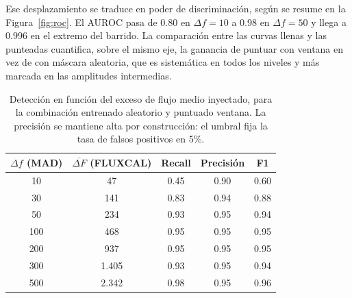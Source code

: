 Ese desplazamiento se traduce en poder de discriminación, según se resume en la Figura~\ref{fig:roc}. El AUROC pasa de 0.80 en $\Delta f = 10$ a 0.98 en $\Delta f = 50$ y llega a 0.996 en el extremo del barrido. La comparación entre las curvas llenas y las punteadas cuantifica, sobre el mismo eje, la ganancia de puntuar con ventana en vez de con máscara aleatoria, que es sistemática en todos los niveles y más marcada en las amplitudes intermedias.

\begin{figure}[H]
\centering
{}
\end{figure}

\begin{table}[H]
\centering
\begin{tabular}{|c|c|c|c|c|}
\hline
$\Delta f$ \textbf{(MAD)} & $\overline{\Delta F}$ \textbf{(FLUXCAL)} & \textbf{Recall} & \textbf{Precisión} & \textbf{F1} \\
\hline
10  & 47    & 0.45 & 0.90 & 0.60 \\
30  & 141   & 0.83 & 0.94 & 0.88 \\
50  & 234   & 0.93 & 0.95 & 0.94 \\
100 & 468   & 0.95 & 0.95 & 0.95 \\
200 & 937   & 0.95 & 0.95 & 0.95 \\
300 & 1.405 & 0.93 & 0.95 & 0.94 \\
500 & 2.342 & 0.98 & 0.95 & 0.96 \\
\hline
\end{tabular}
\caption{Detección en función del exceso de flujo medio inyectado, para la combinación entrenado aleatorio y puntuado ventana. La precisión se mantiene alta por construcción: el umbral fija la tasa de falsos positivos en 5\%.}
\label{tab:deteccion_flux}
\end{table}

\begin{figure}[H]
\centering
{}
\end{figure}


